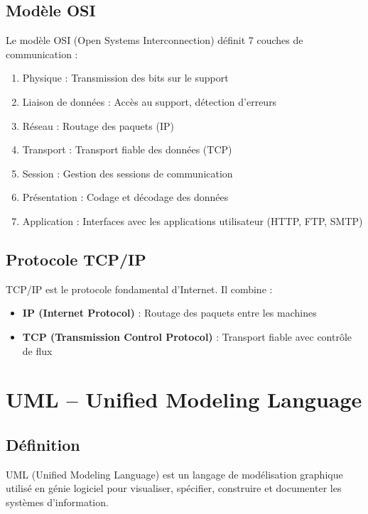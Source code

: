 \documentclass[12pt,a4paper,twoside]{report}
\begin{document}
\section{Modèle OSI}

Le modèle OSI (Open Systems Interconnection) définit 7 couches de communication :
\begin{enumerate}
    \item Physique : Transmission des bits sur le support
    \item Liaison de données : Accès au support, détection d'erreurs
    \item Réseau : Routage des paquets (IP)
    \item Transport : Transport fiable des données (TCP)
    \item Session : Gestion des sessions de communication
    \item Présentation : Codage et décodage des données
    \item Application : Interfaces avec les applications utilisateur (HTTP, FTP, SMTP)
\end{enumerate}

\section{Protocole TCP/IP}

TCP/IP est le protocole fondamental d'Internet. Il combine :
\begin{itemize}
    \item \textbf{IP (Internet Protocol)} : Routage des paquets entre les machines
    \item \textbf{TCP (Transmission Control Protocol)} : Transport fiable avec contrôle de flux
\end{itemize}

\chapter{UML -- Unified Modeling Language}

\section{Définition}

UML (Unified Modeling Language) est un langage de modélisation graphique utilisé en génie logiciel pour visualiser, spécifier, construire et documenter les systèmes d'information.
\end{document}

